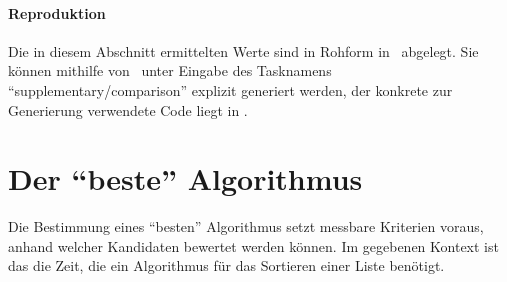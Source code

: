 \paragraph{Reproduktion} Die in diesem Abschnitt ermittelten Werte sind in Rohform in \crDataSupComparison\ abgelegt. Sie können mithilfe von \crScriptsGenerate\ unter Eingabe des Tasknamens \enquote{supplementary/comparison} explizit generiert werden, der konkrete zur Generierung verwendete Code liegt in \crScriptsReciprocalApprox.


\section{Der \enquote{beste} Algorithmus}
\label{sec:best-algo}

Die Bestimmung eines \enquote{besten} Algorithmus setzt messbare Kriterien voraus, anhand welcher Kandidaten bewertet werden können. Im gegebenen Kontext ist das die Zeit, die ein Algorithmus für das Sortieren einer Liste benötigt.

